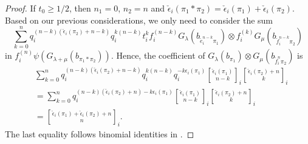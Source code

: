 \documentclass[final]{amsart}
\theoremstyle{plain}
\theoremstyle{definition}
\newcommand{\qbinom}{\genfrac{[}{]}{0pt}{}}
\newcommand{\te}{\tilde e}
\newcommand{\cf}{\check{f}}
\newcommand{\cepsilon}{\check{\epsilon}}
\begin{document}
\begin{proof}
    If $t_0 \ge 1/2$, then $n_1 = 0$, $n_2 = n$ and $\cepsilon_i(\pi_1*\pi_2) = \cepsilon_i(\pi_1) + \cepsilon_i(\pi_2)$.
    Based on our previous considerations, we only need to consider the sum
    \[
        \sum_{k=0}^n q_i^{(n-k)(\cepsilon_i(\pi_2)+n-k)} q_i^{k(n-k)} t_i^k f_i^{(n-k)} G_\lambda(b_{\te_i^{n-k}\pi_1}) \otimes f_i^{(k)} G_\mu(b_{\cf_i^{n-k}\pi_2})
    \]
    in $f_i^{(n)} \psi(G_{\lambda+\mu}(b_{\pi_1*\pi_2}))$.
    Hence, the coefficient of $G_\lambda(b_{\pi_1}) \otimes G_\mu(b_{\cf_i^n\pi_2})$ is
    \begin{align*}
        & \sum_{k=0}^n q_i^{(n-k)(\cepsilon_i(\pi_2)+n-k)} q_i^{k(n-k)} q_i^{-k\epsilon_i(\pi_1)} \qbinom{\cepsilon_i(\pi_1)}{n-k}_i \qbinom{\cepsilon_i(\pi_2)+n}{k}_i \\
        &= \sum_{k=0}^n q_i^{(n-k)(\cepsilon_i(\pi_2)+n) - k\epsilon_i(\pi_1)} \qbinom{\cepsilon_i(\pi_1)}{n-k}_i \qbinom{\cepsilon_i(\pi_2)+n}{k}_i \\
        &= \qbinom{\cepsilon_i(\pi_1)+\cepsilon_i(\pi_2)+n}{n}_i.
    \end{align*}
    The last equality follows binomial identities in \cite{Lusztig:IntroductionToQuantumGroups}.
\end{proof}
\end{document}
